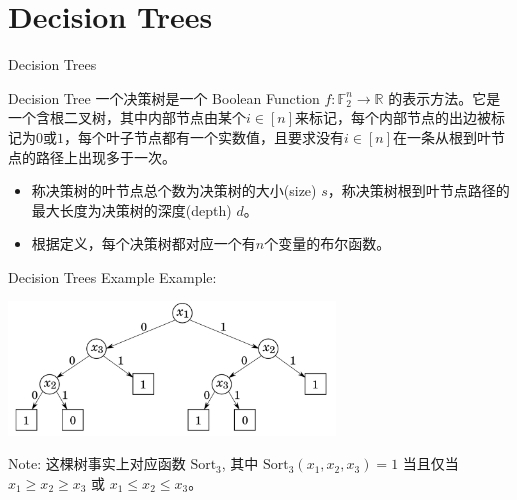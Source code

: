 \section{Decision Trees}

\begin{frame}{Decision Trees}
\begin{block}{Decision Tree}
    一个决策树是一个 Boolean Function $f: \mathbb{F}_2^{n} \to \mathbb{R}$ 的表示方法。它是一个含根二叉树，其中内部节点由某个$i \in [n]$来标记，每个内部节点的出边被标记为$0$或$1$，每个叶子节点都有一个实数值，且要求没有$i \in [n]$在一条从根到叶节点的路径上出现多于一次。
\end{block}
\begin{itemize}
    \item 称决策树的叶节点总个数为决策树的大小(size) $s$，称决策树根到叶节点路径的最大长度为决策树的深度(depth) $d$。
    \item 根据定义，每个决策树都对应一个有$n$个变量的布尔函数。
\end{itemize}
\end{frame}

\begin{frame}{Decision Trees Example}
    Example:
    \begin{center}
        \includegraphics[width=0.65\textwidth]{assets/dtree.png}
    \end{center}

    Note: 这棵树事实上对应函数 $\text{Sort}_3$, 其中 $\text{Sort}_3(x_1, x_2, x_3) = 1$ 当且仅当 $x_1 \geqslant x_2 \geqslant x_3$ 或 $x_1 \leqslant x_2 \leqslant x_3$。
\end{frame}

